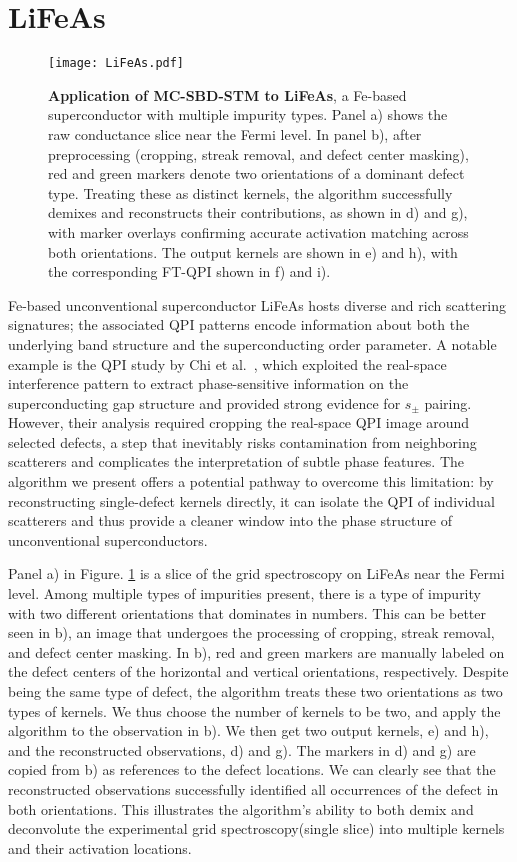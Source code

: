 \section{LiFeAs}

\begin{figure}
	\texttt{[image: LiFeAs.pdf]} 
	\centering
	\caption[\textbf{Application of MC-SBD-STM to LiFeAs}]{\textbf{Application of MC-SBD-STM to LiFeAs}, a Fe-based superconductor with multiple impurity types. Panel a) shows the raw conductance slice near the Fermi level. In panel b), after preprocessing (cropping, streak removal, and defect center masking), red and green markers denote two orientations of a dominant defect type. Treating these as distinct kernels, the algorithm successfully demixes and reconstructs their contributions, as shown in d) and g), with marker overlays confirming accurate activation matching across both orientations. The output kernels are shown in e) and h), with the corresponding FT-QPI shown in f) and i).}
	\label{fig:LiFeAs}
\end{figure}
Fe-based unconventional superconductor LiFeAs hosts diverse and rich scattering signatures; the associated \ac{QPI} patterns encode information about both the underlying band structure and the superconducting order parameter. A notable example is the \ac{QPI} study by Chi et al.~\cite{chiSignInversionSuperconducting2014}, which exploited the real-space interference pattern to extract phase-sensitive information on the superconducting gap structure and provided strong evidence for $s_{\pm}$ pairing. However, their analysis required cropping the real-space QPI image around selected defects, a step that inevitably risks contamination from neighboring scatterers and complicates the interpretation of subtle phase features. The algorithm we present offers a potential pathway to overcome this limitation: by reconstructing single-defect kernels directly, it can isolate the QPI of individual scatterers and thus provide a cleaner window into the phase structure of unconventional superconductors.

Panel a) in Figure. \ref{fig:LiFeAs} is a slice of the grid spectroscopy on LiFeAs near the Fermi level. Among multiple types of impurities present, there is a type of impurity with two different orientations that dominates in numbers. This can be better seen in b), an image that undergoes the processing of cropping, streak removal, and defect center masking. In b), red and green markers are manually labeled on the defect centers of the horizontal and vertical orientations, respectively. Despite being the same type of defect, the algorithm treats these two orientations as two types of kernels. We thus choose the number of kernels to be two, and apply the algorithm to the observation in b). We then get two output kernels, e) and h), and the reconstructed observations, d) and g). The markers in d) and g) are copied from b) as references to the defect locations. We can clearly see that the reconstructed observations successfully identified all occurrences of the defect in both orientations. This illustrates the algorithm's ability to both demix and deconvolute the experimental grid spectroscopy(single slice) into multiple kernels and their activation locations. 

